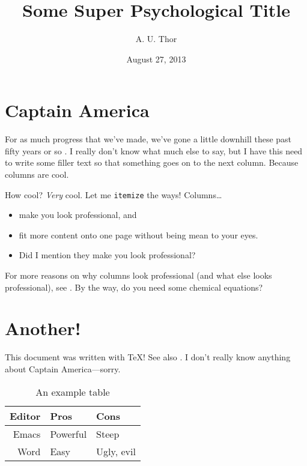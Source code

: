 \documentclass{psypaper}
\title{Some Super Psychological Title}
\author{A. U. Thor}
\affil{St. Mary's College of Maryland}
\date{August 27, 2013}
\begin{document}
\maketitle

\section{Captain America}
For as much progress that we've made,
  we've gone a little downhill
  these past fifty years or so \autocite{rogers:elements}.
I really don't know what much else to say,
  but I have this need to write some filler text
  so that something goes on to the next column.
Because columns are cool.

How cool?
\emph{Very} cool.
Let me \texttt{itemize} the ways!
Columns\dots
\begin{itemize}
\item make you look professional, and
\item fit more content onto one page without being mean to your eyes.
\item Did I mention they make you look professional?
\end{itemize}

For more reasons on why columns look professional
  (and what else looks professional),
  see \cite{compandtype}.
By the way, do you need some chemical equations?


\section{Another!}
This document was written with \TeX! See also \cite{texbook}.
I don't really know anything about Captain America---sorry.

\begin{table}
  \centering
  \begin{tabular}{rll}
    \toprule
    Editor & Pros & Cons \\
    \midrule
    Emacs & Powerful & Steep \\
    Word  & Easy & Ugly, evil \\
    \bottomrule
  \end{tabular}
  \caption{An example table}
  \label{tab:ex}
\end{table}

\printbibliography
\end{document}
